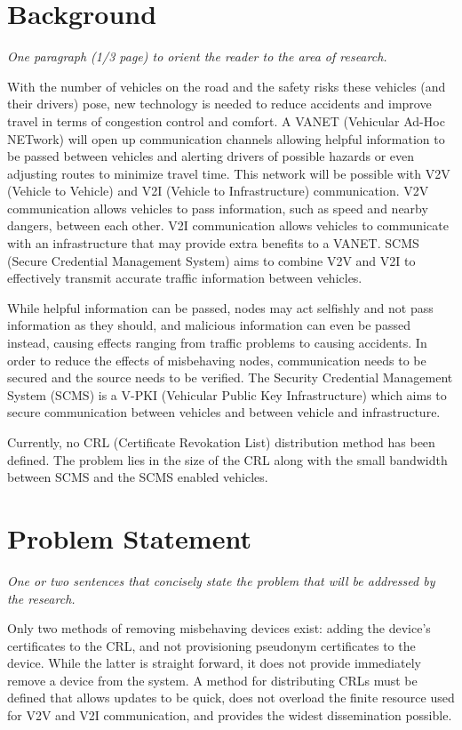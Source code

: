 \documentclass {article}
\newcommand{\sechint}[1]{\small{\emph{#1}} \bigskip}
\begin{document}
\tableofcontents
\pagebreak

\section{Background}{\sechint{One paragraph (1/3 page) to orient the reader to the area of research.}}

With the number of vehicles on the road and the safety risks these vehicles (and their drivers) pose, new technology is needed to reduce accidents and improve travel in terms of congestion control and comfort. A VANET (Vehicular Ad-Hoc NETwork) will open up communication channels allowing helpful information to be passed between vehicles and alerting drivers of possible hazards or even adjusting routes to minimize travel time. This network will be possible with V2V (Vehicle to Vehicle) and V2I (Vehicle to Infrastructure) communication. V2V communication allows vehicles to pass information, such as speed and nearby dangers, between each other. V2I communication allows vehicles to communicate with an infrastructure that may provide extra benefits to a VANET. SCMS (Secure Credential Management System) aims to combine V2V and V2I to effectively transmit accurate traffic information between vehicles.

While helpful information can be passed, nodes may act selfishly and not pass information as they should, and malicious information can even be passed instead, causing effects ranging from traffic problems to causing accidents. In order to reduce the effects of misbehaving nodes, communication needs to be secured and the source needs to be verified. The Security Credential Management System (SCMS) is a V-PKI (Vehicular Public Key Infrastructure) which aims to secure communication between vehicles and between vehicle and infrastructure.

Currently, no CRL (Certificate Revokation List) distribution method has been defined. The problem lies in the size of the CRL along with the small bandwidth between SCMS and the SCMS enabled vehicles.

\section{Problem Statement}{\sechint{One or two sentences that concisely state the problem that will be addressed by the research.}}

Only two methods of removing misbehaving devices exist: adding the device's certificates to the CRL, and not provisioning pseudonym certificates to the device. While the latter is straight forward, it does not provide immediately remove a device from the system. A method for distributing CRLs must be defined that allows updates to be quick, does not overload the finite resource used for V2V and V2I communication, and provides the widest dissemination possible.
\end{document}
